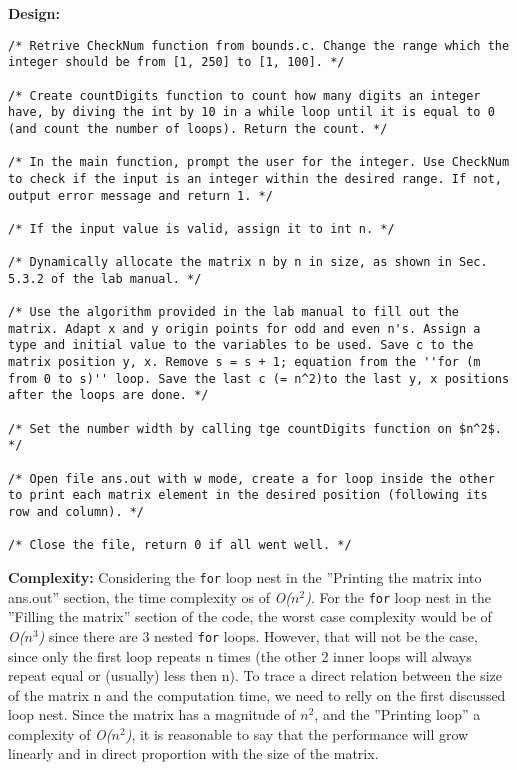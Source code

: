 \documentclass{article}
\begin{document}
\textbf{Design:}
\begin{lstlisting}[numbers=none]
/* Retrive CheckNum function from bounds.c. Change the range which the integer should be from [1, 250] to [1, 100]. */

/* Create countDigits function to count how many digits an integer have, by diving the int by 10 in a while loop until it is equal to 0 (and count the number of loops). Return the count. */

/* In the main function, prompt the user for the integer. Use CheckNum to check if the input is an integer within the desired range. If not, output error message and return 1. */

/* If the input value is valid, assign it to int n. */

/* Dynamically allocate the matrix n by n in size, as shown in Sec. 5.3.2 of the lab manual. */

/* Use the algorithm provided in the lab manual to fill out the matrix. Adapt x and y origin points for odd and even n's. Assign a type and initial value to the variables to be used. Save c to the matrix position y, x. Remove s = s + 1; equation from the ''for (m from 0 to s)'' loop. Save the last c (= n^2)to the last y, x positions after the loops are done. */

/* Set the number width by calling tge countDigits function on $n^2$. */

/* Open file ans.out with w mode, create a for loop inside the other to print each matrix element in the desired position (following its row and column). */

/* Close the file, return 0 if all went well. */
\end{lstlisting}
\hfill \break
\textbf{Complexity:} Considering the \texttt{for} loop nest in the ''Printing the matrix into ans.out'' section, the time complexity os of \textit{O($n^2$)}. For the \texttt{for} loop nest in the ''Filling the matrix'' section of the code, the worst case complexity would be of \textit{O($n^3$)} since there are 3 nested \texttt{for} loops. However, that will not be the case, since only the first loop repeats n times (the other 2 inner loops will always repeat equal or (usually) less then n). To trace a direct relation between the size of the matrix n and the computation time, we need to relly on the first discussed loop nest. Since the matrix has a magnitude of $n^2$, and the ''Printing loop'' a complexity of \textit{O($n^2$)}, it is reasonable to say that the performance will grow linearly and in direct proportion with the size of the matrix.
\end{document}
